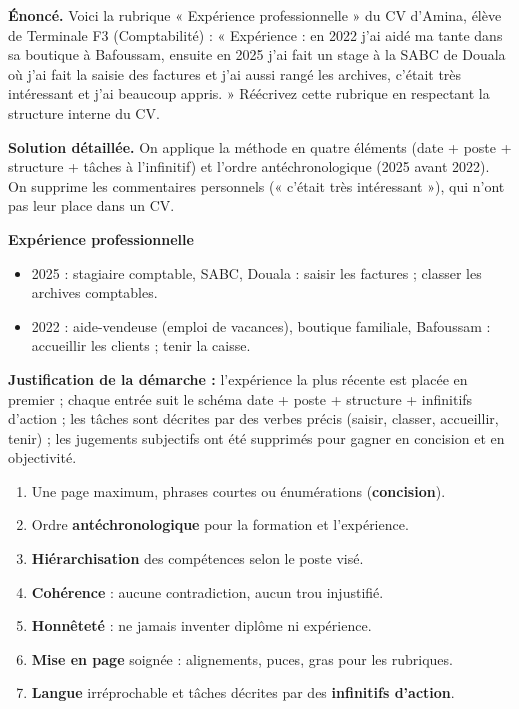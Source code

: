 \documentclass[11pt]{article}
\newcounter{popsec}
\newcounter{popsub}
\newcommand{\courssub}[1]{%
  \stepcounter{popsub}%
  \par\vspace{9pt}\noindent{\popxbold\fontsize{11.5}{13}\selectfont\color{popink}{\color{poporange}\thepopsec.\thepopsub}\hspace{6pt}#1}\par\nopagebreak\vspace{4pt}
}
\begin{document}
\begin{exoresolu}
\textbf{Énoncé.} Voici la rubrique « Expérience professionnelle » du CV d'Amina, élève de Terminale F3 (Comptabilité) : « Expérience : en 2022 j'ai aidé ma tante dans sa boutique à Bafoussam, ensuite en 2025 j'ai fait un stage à la SABC de Douala où j'ai fait la saisie des factures et j'ai aussi rangé les archives, c'était très intéressant et j'ai beaucoup appris. » Réécrivez cette rubrique en respectant la structure interne du CV.

\tcblower
\textbf{Solution détaillée.} On applique la méthode en quatre éléments (date + poste + structure + tâches à l'infinitif) et l'ordre antéchronologique (2025 avant 2022). On supprime les commentaires personnels (« c'était très intéressant »), qui n'ont pas leur place dans un CV.

\medskip
\textbf{Expérience professionnelle}
\begin{itemize}
\item 2025 : stagiaire comptable, SABC, Douala : saisir les factures ; classer les archives comptables.
\item 2022 : aide-vendeuse (emploi de vacances), boutique familiale, Bafoussam : accueillir les clients ; tenir la caisse.
\end{itemize}

\medskip
\textbf{Justification de la démarche :} l'expérience la plus récente est placée en premier ; chaque entrée suit le schéma date + poste + structure + infinitifs d'action ; les tâches sont décrites par des verbes précis (saisir, classer, accueillir, tenir) ; les jugements subjectifs ont été supprimés pour gagner en concision et en objectivité.
\end{exoresolu}

\courssub{Bilan de la section}

\begin{aretenir}
\begin{enumerate}
\item Une page maximum, phrases courtes ou énumérations (\textbf{concision}).
\item Ordre \textbf{antéchronologique} pour la formation et l'expérience.
\item \textbf{Hiérarchisation} des compétences selon le poste visé.
\item \textbf{Cohérence} : aucune contradiction, aucun trou injustifié.
\item \textbf{Honnêteté} : ne jamais inventer diplôme ni expérience.
\item \textbf{Mise en page} soignée : alignements, puces, gras pour les rubriques.
\item \textbf{Langue} irréprochable et tâches décrites par des \textbf{infinitifs d'action}.
\end{enumerate}
\end{aretenir}
\end{document}
